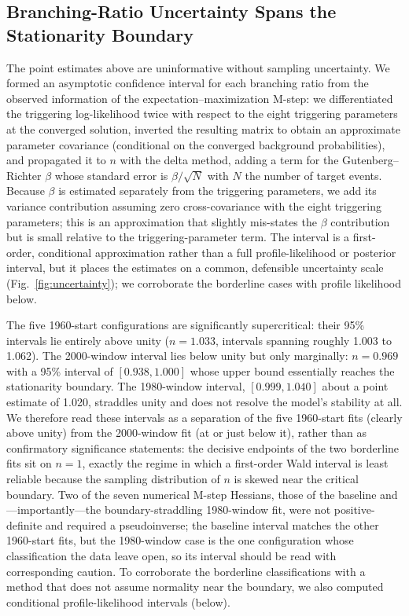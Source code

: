\documentclass[12pt]{article}
\begin{document}
\subsection*{Branching-Ratio Uncertainty Spans the Stationarity Boundary}

The point estimates above are uninformative without sampling uncertainty. We
formed an asymptotic confidence interval for each branching ratio from the
observed information of the expectation--maximization M-step: we differentiated
the triggering log-likelihood twice with respect to the eight triggering
parameters at the converged solution, inverted the resulting matrix to obtain an
approximate parameter covariance (conditional on the converged background
probabilities), and propagated it to $n$ with the delta method, adding a term for
the Gutenberg--Richter $\beta$ whose standard error is $\beta/\sqrt{N}$ with $N$
the number of target events. Because $\beta$ is estimated separately from the
triggering parameters, we add its variance contribution assuming zero
cross-covariance with the eight triggering parameters; this is an approximation
that slightly mis-states the $\beta$ contribution but is small relative to the
triggering-parameter term. The interval is a first-order, conditional
approximation rather than a full profile-likelihood or posterior interval, but it
places the estimates on a common, defensible uncertainty scale
(Fig.~\ref{fig:uncertainty}); we corroborate the borderline cases with profile
likelihood below.

The five 1960-start configurations are significantly supercritical: their
95\% intervals lie entirely above unity ($n=1.033$, intervals spanning roughly
1.003 to 1.062). The 2000-window interval lies below unity but only marginally:
$n=0.969$ with a 95\% interval of $[0.938,1.000]$ whose upper bound essentially
reaches the stationarity boundary. The 1980-window interval, $[0.999,1.040]$
about a point estimate of 1.020, straddles unity and does not resolve the model's
stability at all. We therefore read these intervals as a separation of the five
1960-start fits (clearly above unity) from the 2000-window fit (at or just below
it), rather than as confirmatory significance statements: the decisive endpoints
of the two borderline fits sit on $n=1$, exactly the regime in which a
first-order Wald interval is least reliable because the sampling distribution of
$n$ is skewed near the critical boundary. Two of the seven numerical M-step
Hessians, those of the baseline and---importantly---the boundary-straddling
1980-window fit, were not positive-definite and required a pseudoinverse; the
baseline interval matches the other 1960-start fits, but the 1980-window case is
the one configuration whose classification the data leave open, so its interval
should be read with corresponding caution. To corroborate the borderline
classifications with a method that does not assume normality near the boundary,
we also computed conditional profile-likelihood intervals (below).
\end{document}
